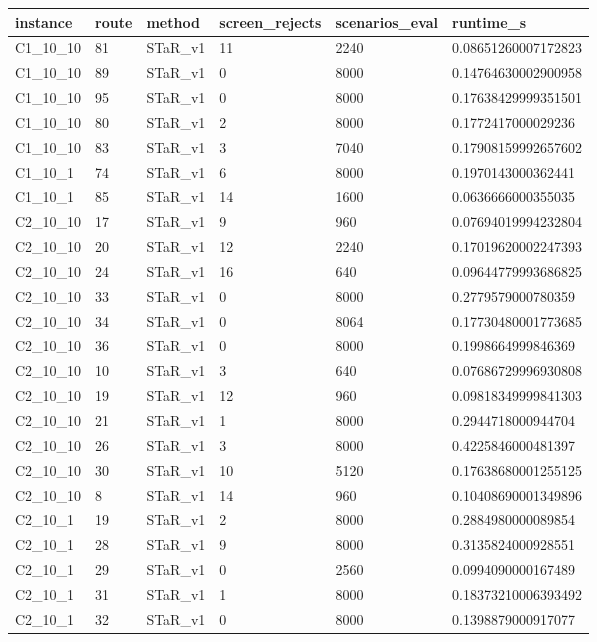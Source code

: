 \begin{tabular}{llllll}
 \hline
 instance & route & method & screen\_rejects & scenarios\_eval & runtime\_s \\
 \hline
 C1\_10\_10 & 81 & STaR\_v1 & 11 & 2240 & 0.08651260007172823 \\
 C1\_10\_10 & 89 & STaR\_v1 & 0 & 8000 & 0.14764630002900958 \\
 C1\_10\_10 & 95 & STaR\_v1 & 0 & 8000 & 0.17638429999351501 \\
 C1\_10\_10 & 80 & STaR\_v1 & 2 & 8000 & 0.1772417000029236 \\
 C1\_10\_10 & 83 & STaR\_v1 & 3 & 7040 & 0.17908159992657602 \\
 C1\_10\_1 & 74 & STaR\_v1 & 6 & 8000 & 0.1970143000362441 \\
 C1\_10\_1 & 85 & STaR\_v1 & 14 & 1600 & 0.0636666000355035 \\
 C2\_10\_10 & 17 & STaR\_v1 & 9 & 960 & 0.07694019994232804 \\
 C2\_10\_10 & 20 & STaR\_v1 & 12 & 2240 & 0.17019620002247393 \\
 C2\_10\_10 & 24 & STaR\_v1 & 16 & 640 & 0.09644779993686825 \\
 C2\_10\_10 & 33 & STaR\_v1 & 0 & 8000 & 0.2779579000780359 \\
 C2\_10\_10 & 34 & STaR\_v1 & 0 & 8064 & 0.17730480001773685 \\
 C2\_10\_10 & 36 & STaR\_v1 & 0 & 8000 & 0.1998664999846369 \\
 C2\_10\_10 & 10 & STaR\_v1 & 3 & 640 & 0.07686729996930808 \\
 C2\_10\_10 & 19 & STaR\_v1 & 12 & 960 & 0.09818349999841303 \\
 C2\_10\_10 & 21 & STaR\_v1 & 1 & 8000 & 0.2944718000944704 \\
 C2\_10\_10 & 26 & STaR\_v1 & 3 & 8000 & 0.4225846000481397 \\
 C2\_10\_10 & 30 & STaR\_v1 & 10 & 5120 & 0.17638680001255125 \\
 C2\_10\_10 & 8 & STaR\_v1 & 14 & 960 & 0.10408690001349896 \\
 C2\_10\_1 & 19 & STaR\_v1 & 2 & 8000 & 0.2884980000089854 \\
 C2\_10\_1 & 28 & STaR\_v1 & 9 & 8000 & 0.3135824000928551 \\
 C2\_10\_1 & 29 & STaR\_v1 & 0 & 2560 & 0.0994090000167489 \\
 C2\_10\_1 & 31 & STaR\_v1 & 1 & 8000 & 0.18373210006393492 \\
 C2\_10\_1 & 32 & STaR\_v1 & 0 & 8000 & 0.1398879000917077 \\

\end{tabular}
